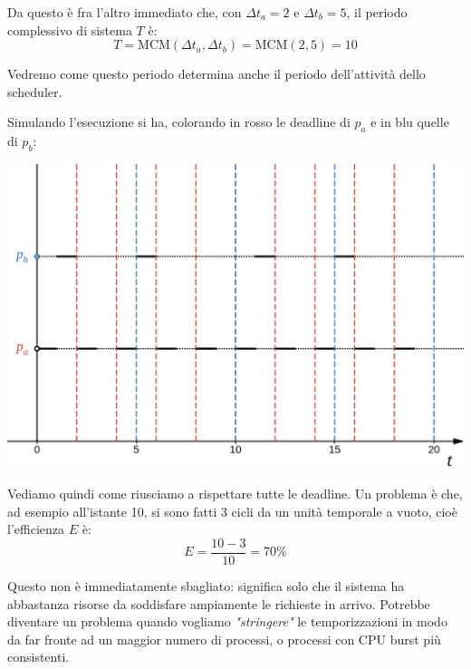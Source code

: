 \documentclass[a4paper,11pt]{article}
\begin{document}
Da questo è fra l'altro immediato che, con $\Delta t_a = 2$ e $\Delta t_b = 5$, il periodo complessivo di sistema $T$ è:
$$
T = \text{MCM}(\Delta t_a, \Delta t_b) = \text{MCM}(2, 5) = 10
$$

Vedremo come questo periodo determina anche il periodo dell'attività dello scheduler.

\newpage

Simulando l'esecuzione si ha, colorando in rosso le deadline di $p_a$ e in blu quelle di $p_b$:
\begin{center}
	\includegraphics[scale=0.3]{../figures/rm.png}
\end{center}

Vediamo quindi come riusciamo a rispettare tutte le deadline.
Un problema è che, ad esempio all'istante 10, si sono fatti 3 cicli da un unità temporale a vuoto, cioè l'efficienza $E$ è:
$$
E = \frac{10 - 3}{10} = 70 \%
$$

Questo non è immediatamente sbagliato: significa solo che il sistema ha abbastanza risorse da soddisfare ampiamente le richieste in arrivo.
Potrebbe diventare un problema quando vogliamo \textit{"stringere"} le temporizzazioni in modo da far fronte ad un maggior numero di processi, o processi con CPU burst più consistenti.
\end{document}

